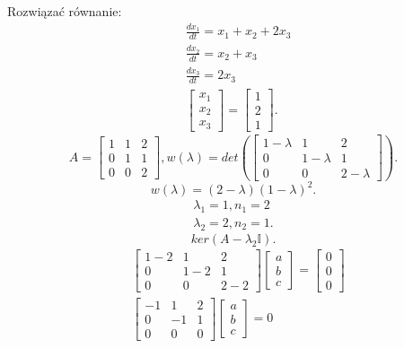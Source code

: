 \documentclass[../main.tex]{subfiles}
\begin{document}
\begin{przyklad}
    Rozwiązać równanie:
    \begin{align*}
        &\frac{dx_1}{dt} = x_1+x_2+2x_3\\
        &\frac{dx_2}{dt} = x_2+x_3\\
        &\frac{dx_3}{dt} = 2x_3\\
        &\begin{bmatrix} x_1\\x_2\\x_3 \end{bmatrix} = \begin{bmatrix} 1\\2\\1 \end{bmatrix}
    .\end{align*}
    \[
        A = \begin{bmatrix} 1&1&2\\0&1&1\\0&0&2 \end{bmatrix}, w(\lambda) = det\left( \begin{bmatrix} 1-\lambda&1&2\\0&1-\lambda&1\\0&0&2-\lambda \end{bmatrix}  \right)
    .\]
    \[
        w(\lambda) = (2-\lambda)(1-\lambda)^2
    .\]
    \begin{align*}
        \lambda_1 = 1, n_1 = 2\\
        \lambda_2 = 2, n_2 = 1
    .\end{align*}
    \[
        ker(A-\lambda_2\mathbb{I})
    .\]
    \begin{align*}
        &\begin{bmatrix} 1-2&1&2\\0&1-2&1\\0&0&2-2 \end{bmatrix} \begin{bmatrix} a\\b\\c \end{bmatrix} = \begin{bmatrix} 0\\0\\0 \end{bmatrix}\\
        &\begin{bmatrix} -1&1&2\\0&-1&1\\0&0&0 \end{bmatrix} \begin{bmatrix} a\\b\\c\end{bmatrix} = 0\\

\end{align*}
\end{przyklad}
\end{document}
